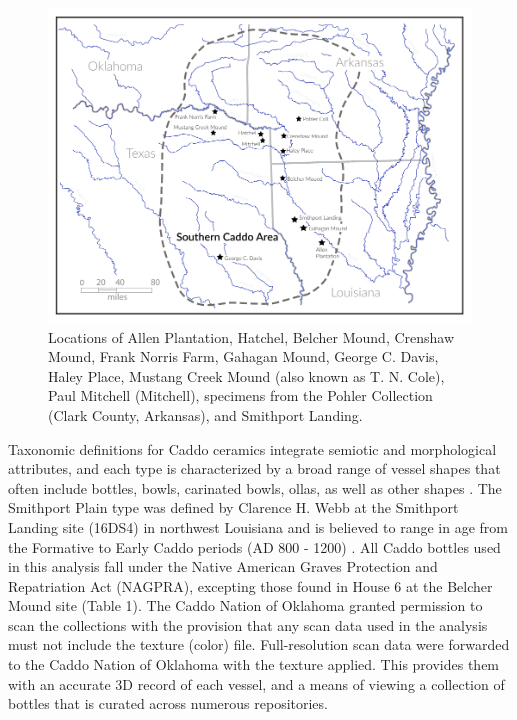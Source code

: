 \documentclass[article]{sa}
\begin{document}
\begin{figure}[ht]\centering
\includegraphics[width=\linewidth]{Figure_01}
\caption{Locations of Allen Plantation, Hatchel, Belcher Mound, Crenshaw Mound, Frank Norris Farm, Gahagan Mound, George C. Davis, Haley Place, Mustang Creek Mound (also known as T. N. Cole), Paul Mitchell (Mitchell), specimens from the Pohler Collection (Clark County, Arkansas), and Smithport Landing.}
\label{fig:fig1}
\end{figure}

Taxonomic definitions for Caddo ceramics integrate semiotic and morphological attributes, and each type is characterized by a broad range of vessel shapes that often include bottles, bowls, carinated bowls, ollas, as well as other shapes \citep{RN870,RN5066}. The Smithport Plain type was defined by Clarence H. Webb \citep{RN5266} at the Smithport Landing site (16DS4) in northwest Louisiana and is believed to range in age from the Formative to Early Caddo periods (AD 800 - 1200) \citep{RN5270}. All Caddo bottles used in this analysis fall under the Native American Graves Protection and Repatriation Act (NAGPRA), excepting those found in House 6 at the Belcher Mound site (Table 1). The Caddo Nation of Oklahoma granted permission to scan the collections with the provision that any scan data used in the analysis must not include the texture (color) file. Full-resolution scan data were forwarded to the Caddo Nation of Oklahoma with the texture applied. This provides them with an accurate 3D record of each vessel, and a means of viewing a collection of bottles that is curated across numerous repositories.
\end{document}
